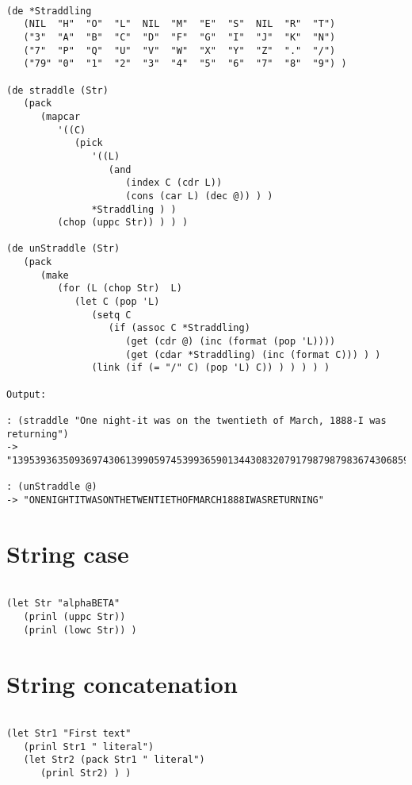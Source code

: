 \begin{verbatim}

(de *Straddling
   (NIL  "H"  "O"  "L"  NIL  "M"  "E"  "S"  NIL  "R"  "T")
   ("3"  "A"  "B"  "C"  "D"  "F"  "G"  "I"  "J"  "K"  "N")
   ("7"  "P"  "Q"  "U"  "V"  "W"  "X"  "Y"  "Z"  "."  "/")
   ("79" "0"  "1"  "2"  "3"  "4"  "5"  "6"  "7"  "8"  "9") )

(de straddle (Str)
   (pack
      (mapcar
         '((C)
            (pick
               '((L)
                  (and
                     (index C (cdr L))
                     (cons (car L) (dec @)) ) )
               *Straddling ) )
         (chop (uppc Str)) ) ) )

(de unStraddle (Str)
   (pack
      (make
         (for (L (chop Str)  L)
            (let C (pop 'L)
               (setq C
                  (if (assoc C *Straddling)
                     (get (cdr @) (inc (format (pop 'L))))
                     (get (cdar *Straddling) (inc (format C))) ) )
               (link (if (= "/" C) (pop 'L) C)) ) ) ) ) )

Output:

: (straddle "One night-it was on the twentieth of March, 1888-I was returning")
-> "139539363509369743061399059745399365901344308320791798798798367430685972839363935"

: (unStraddle @)
-> "ONENIGHTITWASONTHETWENTIETHOFMARCH1888IWASRETURNING"

\end{verbatim}

\section*{String case}

\begin{verbatim}

(let Str "alphaBETA"
   (prinl (uppc Str))
   (prinl (lowc Str)) )

\end{verbatim}

\section*{String concatenation}

\begin{verbatim}

(let Str1 "First text"
   (prinl Str1 " literal")
   (let Str2 (pack Str1 " literal")
      (prinl Str2) ) )

\end{verbatim}


